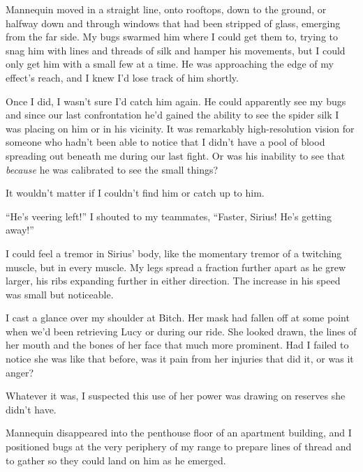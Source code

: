 Mannequin moved in a straight line, onto rooftops, down to the ground, or halfway down and through windows that had been stripped of glass, emerging from the far side.  My bugs swarmed him where I could get them to, trying to snag him with lines and threads of silk and hamper his movements, but I could only get him with a small few at a time.  He was approaching the edge of my effect's reach, and I knew I'd lose track of him shortly.



Once I did, I wasn't sure I'd catch him again.  He could apparently see my bugs and since our last confrontation he'd gained the ability to see the spider silk I was placing on him or in his vicinity.  It was remarkably high-resolution vision for someone who hadn't been able to notice that I didn't have a pool of blood spreading out beneath me during our last fight.  Or was his inability to see that \emph{because} he was calibrated to see the small things?



It wouldn't matter if I couldn't find him or catch up to him.



``He's veering left!'' I shouted to my teammates, ``Faster, Sirius!  He's getting away!''



I could feel a tremor in Sirius' body, like the momentary tremor of a twitching muscle, but in every muscle.  My legs spread a fraction further apart as he grew larger, his ribs expanding further in either direction.  The increase in his speed was small but noticeable.



I cast a glance over my shoulder at Bitch.  Her mask had fallen off at some point when we'd been retrieving Lucy or during our ride.  She looked drawn, the lines of her mouth and the bones of her face that much more prominent.  Had I failed to notice she was like that before, was it pain from her injuries that did it, or was it anger?



Whatever it was, I suspected this use of her power was drawing on reserves she didn't have.



Mannequin disappeared into the penthouse floor of an apartment building, and I positioned bugs at the very periphery of my range to prepare lines of thread and to gather so they could land on him as he emerged.



